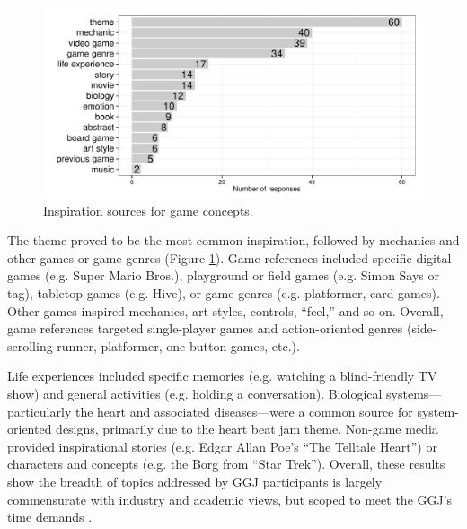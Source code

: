 \documentclass{sig-alternate}
\begin{document}
\begin{figure}[tbph]
\centering
\includegraphics[width=\linewidth]{./inspiration}
\caption{Inspiration sources for game concepts.}
\label{fig:inspiration}
\end{figure}


The theme proved to be the most common inspiration, followed by mechanics and other games or game genres (Figure \ref{fig:inspiration}).
Game references included specific digital games (e.g. Super Mario Bros.), playground or field games (e.g. Simon Says or tag), tabletop games (e.g. Hive), or game genres (e.g. platformer, card games). Other games inspired mechanics, art styles, controls, ``feel,'' and so on. 
Overall, game references targeted single-player games and action-oriented genres (side-scrolling runner, platformer, one-button games, etc.).

Life experiences included specific memories (e.g. watching a blind-friendly TV show) and general activities (e.g. holding a conversation).
Biological systems---particularly the heart and associated diseases---were a common source for system-oriented designs, primarily due to the heart beat jam theme.
Non-game media provided inspirational stories (e.g. Edgar Allan Poe's ``The Telltale Heart'') or characters and concepts (e.g. the Borg from ``Star Trek'').
Overall, these results show the breadth of topics addressed by GGJ participants is largely commensurate with industry and academic views, but scoped to meet the GGJ's time demands \cite{bogost2011:howto}.
\end{document}
